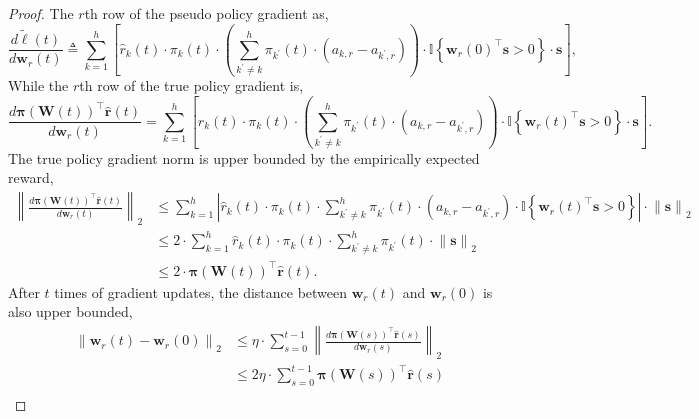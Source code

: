 \documentclass[10pt]{article}
\def\rvr{{\mathbf{r}}}
\def\rvs{{\mathbf{s}}}
\def\rvw{{\mathbf{w}}}
\def\rvpi{{\boldsymbol{\pi}}}
\def\rmW{{\mathbf{W}}}
\def\sI{{\mathbb{I}}}
\begin{document}
\begin{proof}
The $r$th row of the pseudo policy gradient as,
\begin{equation*}
	\frac{d \tilde{\ell}(t)}{d \rvw_r(t)} \triangleq \sum\limits_{k=1}^{h}{ \left[ \hat{r}_{k}\left(t\right) \cdot \pi_{k}(t) \cdot \left( \sum\limits_{k^\prime \not= k}^{h}{ \pi_{k^\prime}(t) \cdot \left( a_{k,r} - a_{k^\prime,r} \right)  } \right) \cdot \sI\left\{ \rvw_r(0)^\top \rvs > 0 \right\} \cdot \rvs \right] },
\end{equation*}
While the $r$th row of the true policy gradient is,
\begin{equation*}
	\frac{d \rvpi\left( \rmW(t) \right)^\top \hat{\rvr}\left(t\right)}{d \rvw_r(t)} = \sum\limits_{k=1}^{h}{ \left[\hat{r}_{k}\left(t\right) \cdot \pi_{k}(t) \cdot \left( \sum\limits_{k^\prime \not= k}^{h}{ \pi_{k^\prime}(t) \cdot \left( a_{k,r} - a_{k^\prime,r} \right)  } \right) \cdot \sI\left\{ \rvw_r(t)^\top \rvs > 0 \right\} \cdot \rvs \right] }.
\end{equation*}
The true policy gradient norm is upper bounded by the empirically expected reward,
\begin{equation*}
\begin{split}
	\left\| \frac{d \rvpi\left( \rmW(t) \right)^\top \hat{\rvr}\left(t\right)}{d \rvw_r(t)} \right\|_2 &\le \sum\limits_{k=1}^{h}{ \left|\hat{r}_{k}\left(t\right) \cdot \pi_{k}(t) \cdot \sum\limits_{k^\prime \not= k}^{h}{ \pi_{k^\prime}(t) \cdot \left( a_{k,r} - a_{k^\prime,r} \right)  } \cdot \sI\left\{ \rvw_r(t)^\top \rvs > 0 \right\} \right| \cdot \left\| \rvs \right\|_2 } \\
	&\le 2 \cdot \sum\limits_{k=1}^{h}{\hat{r}_{k}\left(t\right) \cdot \pi_{k}(t) \cdot \sum\limits_{k^\prime \not= k}^{h}{ \pi_{k^\prime}(t)  } \cdot \left\| \rvs \right\|_2  } \\
	&\le 2 \cdot \rvpi\left(\rmW(t)\right)^\top \hat{\rvr}\left(t\right).
\end{split}
\end{equation*}
After $t$ times of gradient updates, the distance between $\rvw_r(t)$ and $\rvw_r(0)$ is also upper bounded,
\begin{equation*}
\begin{split}
	\left\| \rvw_r(t) - \rvw_r(0) \right\|_2 &\le \eta \cdot \sum\limits_{s=0}^{t-1}{\left\| \frac{d \rvpi\left( \rmW(s) \right)^\top \hat{\rvr}\left(s\right)}{d \rvw_r(s)} \right\|_2} \\
	&\le 2 \eta \cdot \sum\limits_{s=0}^{t-1}{ \rvpi\left(\rmW(s)\right)^\top \hat{\rvr}\left(s\right) } \\

\end{split}
\end{equation*}
\end{proof}
\end{document}
